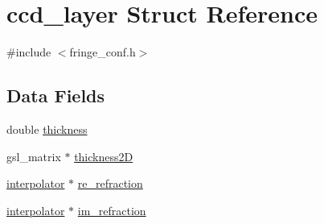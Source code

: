 \hypertarget{structccd__layer}{
\section{ccd\_\-layer Struct Reference}
\label{structccd__layer}
}


{\ttfamily \#include $<$fringe\_\-conf.h$>$}\subsection*{Data Fields}
\begin{DoxyCompactItemize}
\item 
double \hyperlink{structccd__layer_a8bada4a0ff9e515bd8c177644d72af1a}{thickness}
\item 
gsl\_\-matrix $\ast$ \hyperlink{structccd__layer_a831ea82c1e042d7fc58c507b682a32b0}{thickness2D}
\item 
\hyperlink{structinterpolator}{interpolator} $\ast$ \hyperlink{structccd__layer_add2149e5c5ee94567c955b2cd82c7e92}{re\_\-refraction}
\item 
\hyperlink{structinterpolator}{interpolator} $\ast$ \hyperlink{structccd__layer_a893d59ee0cd5db8abd32b4259a0a7484}{im\_\-refraction}
\end{DoxyCompactItemize}


